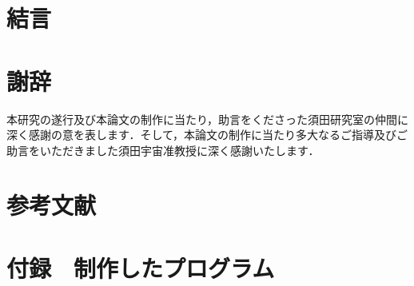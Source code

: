 \documentclass[a4j,12pt]{jsarticle}
\begin{document}
\section{結言}
\newpage

\section{謝辞}
本研究の遂行及び本論文の制作に当たり，助言をくださった須田研究室の仲間に深く感謝の意を表します．そして，本論文の制作に当たり多大なるご指導及びご助言をいただきました須田宇宙准教授に深く感謝いたします．
\newpage

\section{参考文献}
\newpage

\section{付録　制作したプログラム}
\end{document}
